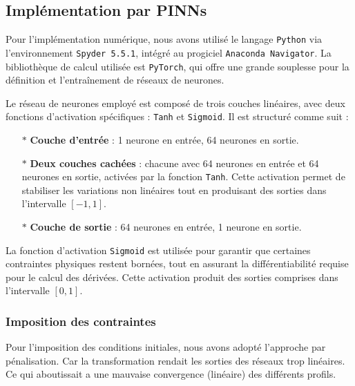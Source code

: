 \documentclass[12pt, oneside]{report} %
\theoremstyle{definition}
\theoremstyle{remark}
\begin{document}
			\subsection{Implémentation par PINNs}
		Pour l’implémentation numérique, nous avons utilisé le langage \texttt{Python} via l’environnement \texttt{Spyder 5.5.1}, intégré au progiciel \texttt{Anaconda Navigator}.  
		La bibliothèque de calcul utilisée est \texttt{PyTorch}, qui offre une grande souplesse pour la définition et l’entraînement de réseaux de neurones.
		
		Le réseau de neurones employé est composé de trois couches linéaires, avec deux fonctions d’activation spécifiques : \texttt{Tanh} et \texttt{Sigmoid}. Il est structuré comme suit :
		
		\begin{itemize}
			\item[$\ast$] \textbf{Couche d’entrée} : 1 neurone en entrée, 64 neurones en sortie.
			
			\item[$\ast$] \textbf{Deux couches cachées} : chacune avec 64 neurones en entrée et 64 neurones en sortie, activées par la fonction \texttt{Tanh}.  
			Cette activation permet de stabiliser les variations non linéaires tout en produisant des sorties dans l’intervalle $[-1, 1]$.
			
			\item[$\ast$] \textbf{Couche de sortie} : 64 neurones en entrée, 1 neurone en sortie.
		\end{itemize}
		
		La fonction d’activation \texttt{Sigmoid} est utilisée pour garantir que certaines contraintes physiques restent bornées, tout en assurant la différentiabilité requise pour le calcul des dérivées.  
		Cette activation produit des sorties comprises dans l’intervalle $[0, 1]$.
		
		\subsubsection*{Imposition des contraintes}
		Pour l'imposition des conditions initiales, nous avons adopté l'approche par pénalisation. Car la transformation rendait les sorties des réseaux trop linéaires. Ce qui aboutissait a une mauvaise convergence (linéaire) des différents profils. 
		
\end{document}
